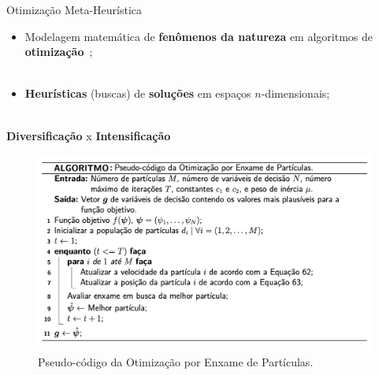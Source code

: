 \begin{frame}{Otimização Meta-Heurística}
	\begin{itemize}
		\justifying
		\item Modelagem matemática de \textbf{fenômenos da natureza} em algoritmos de \textbf{otimização}~\cite{yang_review};
		\\~\\
		\item \textbf{Heurísticas} (buscas) de \textbf{soluções} em espaços $n$-dimensionais;
		\\~\\
	\end{itemize}
	\vspace*{0.5cm}
	\begin{block}{}
		\centering
		\textbf{Diversificação} x \textbf{Intensificação}
	\end{block}	
\end{frame}

\begin{frame}
	\begin{figure}
		\centering
		\includegraphics[scale=0.375]{figs/pso.png}	
		\caption{Pseudo-código da Otimização por Enxame de Partículas.}
		\label{f.pso}
	\end{figure}
\end{frame}